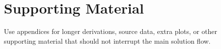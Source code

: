 \section{Supporting Material}

Use appendices for longer derivations, source data, extra plots, or other
supporting material that should not interrupt the main solution flow.
